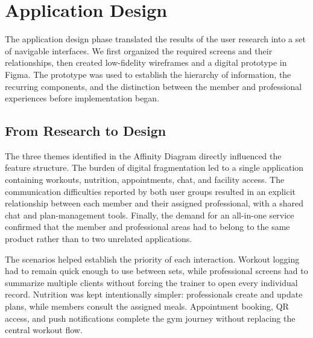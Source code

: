 \section{Application Design}\label{sect:ApplicationDesign}

The application design phase translated the results of the user research into a set of navigable interfaces. We first organized the required screens and their relationships, then created low-fidelity wireframes and a digital prototype in Figma. The prototype was used to establish the hierarchy of information, the recurring components, and the distinction between the member and professional experiences before implementation began.

\subsection{From Research to Design}\label{subsect:FromResearchToDesign}

The three themes identified in the Affinity Diagram directly influenced the feature structure. The burden of digital fragmentation led to a single application containing workouts, nutrition, appointments, chat, and facility access. The communication difficulties reported by both user groups resulted in an explicit relationship between each member and their assigned professional, with a shared chat and plan-management tools. Finally, the demand for an all-in-one service confirmed that the member and professional areas had to belong to the same product rather than to two unrelated applications.

The scenarios helped establish the priority of each interaction. Workout logging had to remain quick enough to use between sets, while professional screens had to summarize multiple clients without forcing the trainer to open every individual record. Nutrition was kept intentionally simpler: professionals create and update plans, while members consult the assigned meals. Appointment booking, QR access, and push notifications complete the gym journey without replacing the central workout flow.






